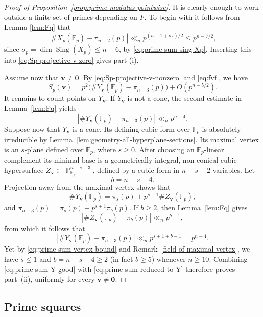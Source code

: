 \documentclass[a4paper,11pt, twoside,reqno]{amsart}
\theoremstyle{plain}
\theoremstyle{definition}
\theoremstyle{remark}
\newcommand{\bfv}{\bm{v}}
\DeclareMathOperator{\PP}{\mathbb{P}}
\DeclareMathOperator{\Sing}{Sing}
\renewcommand{\bar}{\overline}
\renewcommand{\le}{\leqslant}
\renewcommand{\leq}{\leqslant}
\renewcommand{\ge}{\geqslant}
\renewcommand{\geq}{\geqslant}
\newcommand{\FF}{\mathbb{F}}
\numberwithin{equation}{section}
\begin{document}
\begin{proof}[Proof of Proposition~\ref{prop:prime-modulus-pointwise}]
It is clearly enough to work outside a finite set of primes depending on $F$.  
To begin with it follows from 
Lemma \ref{lem:Fq} that 
\begin{equation}\label{eq:fvf}
\left|    \#X_p(\FF_p)-\pi_{n-2}(p)\right|
       \ll_n p^{(n-1+\sigma_p)/2}\leq p^{n-7/2},
\end{equation}
since $\sigma_p=\dim\Sing(X_{p})\leq n-6$, 
by \eqref{eq:prime-sum-sing-Xp}.
Inserting this into  \eqref{eq:Sp-projective-v-zero} gives part (i).

Assume now that $\bar{\bfv}\neq\bm 0$.  By 
\eqref{eq:Sp-projective-v-nonzero} and \eqref{eq:fvf}, we have
\begin{equation}
    S_p(\bfv)
      =p^2\bigl(\#Y_{\bfv}(\FF_p)-\pi_{n-3}(p)\bigr)
       +O(p^{n-5/2}).
    \label{eq:prime-sum-reduced-to-Y}
\end{equation}
It remains to count points on $Y_{\bfv}$.
If $Y_{\bfv}$ is not a cone, the second estimate in
Lemma~\ref{lem:Fq} yields
\[
\left|    \#Y_{\bfv}(\FF_p)-\pi_{n-3}(p)\right|\ll_n p^{n-4}.
\]
Suppose now that $Y_{\bfv}$ is a cone.
Its defining cubic form over $\FF_p$
is absolutely irreducible by Lemma~\ref{lem:geometry-all-hyperplane-sections}.
Its maximal vertex is an $s$-plane defined over $\FF_p$, where $s\ge 0$.
After choosing an $\FF_p$-linear complement its minimal base is a geometrically
integral, non-conical cubic hypersurface
$Z_{\bfv}\subset\PP^{n-s-3}_{\FF_p}$,
defined by a cubic form in $n-s-2$ variables.
Let
$$
b=n-s-4.
$$
Projection away from the maximal vertex shows that
\[
    \#Y_{\bfv}(\FF_p)
       =\pi_s(p)+p^{s+1}\#Z_{\bfv}(\FF_p),
\]
and $\pi_{n-3}(p)=\pi_s(p)+p^{s+1}\pi_b(p)$.
If $b\geq2$, then Lemma~\ref{lem:Fq} gives
\[
   \left| \#Z_{\bfv}(\FF_p)-\pi_b(p)\right|\ll_n p^{b-1},
\]
from which it follows that 
\begin{equation}
\left|    \#Y_{\bfv}(\FF_p)-\pi_{n-3}(p)\right|
      \ll_n p^{s+1+b-1}=p^{n-4}.
    \label{eq:prime-sum-Y-good}
\end{equation}
Yet by \eqref{eq:prime-sum-vertex-bound} and Remark~\ref{field-of-maximal-vertex},
we have $s\le 1$
and $b=n-s-4\ge 2$ (in fact $b\ge 5$)
whenever $n\geq 10$.
Combining \eqref{eq:prime-sum-Y-good} with
\eqref{eq:prime-sum-reduced-to-Y} therefore proves part~(ii), uniformly for every
$\bar{\bfv}\neq\bm 0$.
\end{proof}

\subsection{Prime squares}
\label{sec:prime-square-strat}
\end{document}
